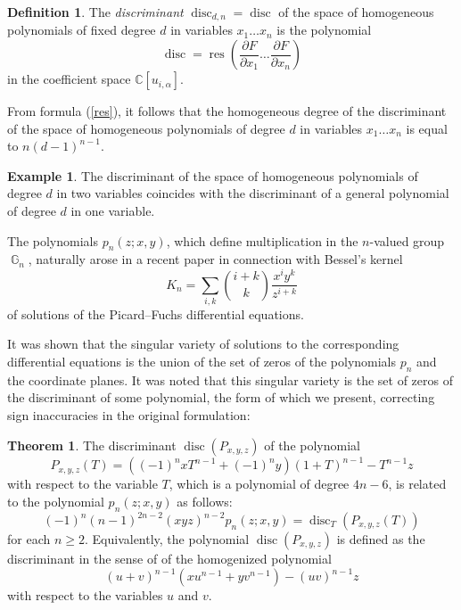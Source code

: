 \documentclass[14pt, dvipsnames]{extarticle}
\theoremstyle{definition}
\newtheorem{theorem}{Theorem}
\theoremstyle{definition}
\newtheorem{defi}{Definition}
\newtheorem{example}{\bf Example}
\theoremstyle{remark}
\DeclareMathOperator{\res}{\mathrm{res}}
\DeclareMathOperator{\G}{\mathbb{G}}
\DeclareMathOperator{\disc}{\mathrm{disc}}
\begin{document}
\begin{defi}
The {\it discriminant} $\disc_{d, n} = \disc$ of the space of homogeneous polynomials of fixed degree $d$ in variables $x_1\dots x_n$ is the polynomial
$$\disc = \res\left(\frac{\partial{F}}{\partial{x_1}}\dots \frac{\partial{F}}{\partial{x_n}}\right)$$
in the coefficient space $\mathbb{C}[u_{i, \alpha}]$.
\end{defi}

From formula (\ref{res}), it follows that the homogeneous degree of the discriminant of the space of homogeneous polynomials of degree $d$ in variables $x_1\dots x_n$ is equal to $n(d-1)^{n-1}$.

\begin{example}
The discriminant of the space of homogeneous polynomials of degree $d$ in two variables coincides with the discriminant of a general polynomial of degree $d$ in one variable.
\end{example}

The polynomials $p_n(z; x, y)$, which define multiplication in the $n$-valued group $\G_n$, naturally arose in a recent paper \cite{Gaiur} in connection with Bessel's kernel $$K_n = \sum\limits_{i, k} \binom{i + k}{k} \frac{x^i y^k}{z^{i+k}}$$ of solutions of the Picard–Fuchs differential equations.

It was shown \cite[Theorem 2.3]{Gaiur} that the singular variety of solutions to the corresponding differential equations is the union of the set of zeros of the polynomials $p_n$ and the coordinate planes. It was noted that this singular variety is the set of zeros of the discriminant of some polynomial, the form of which we present, correcting sign inaccuracies in the original formulation:

\begin{theorem}\label{discriminant_two_dim}
The discriminant $\disc(P_{x, y, z})$ of the polynomial
$$P_{x, y, z}(T) = ((-1)^n x T^{n-1} + (-1)^n y)(1 + T)^{n-1} - T^{n-1} z$$
with respect to the variable $T$, which is a polynomial of degree $4n - 6$, is related to the polynomial $p_n(z; x, y)$ as follows:
$$(-1)^n (n-1)^{2n-2} (xyz)^{n-2} p_n(z; x, y) = \disc_T(P_{x, y, z}(T))$$
for each $n \geqslant 2$. Equivalently, the polynomial $\disc(P_{x, y, z})$ is defined as the discriminant in the sense of \cite{Gelfand} of the homogenized polynomial
$$(u+v)^{n-1} (x u^{n-1} + y v^{n-1}) - (u v)^{n-1} z$$
with respect to the variables $u$ and $v$.
\end{theorem}
\end{document}
